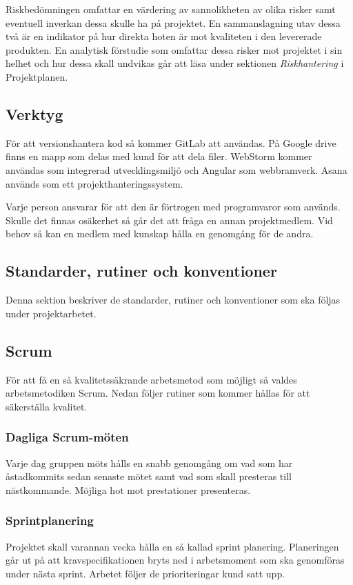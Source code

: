 \documentclass[a4paper,10pt]{article}
\begin{document}
Riskbedömningen omfattar en värdering av sannolikheten av olika risker samt eventuell inverkan dessa skulle ha på projektet. En sammanslagning utav dessa två är en indikator på hur direkta hoten är mot kvaliteten i den levererade produkten.
En analytisk förstudie som omfattar dessa risker mot projektet i sin helhet och hur dessa skall undvikas går att läsa under sektionen \emph{Riskhantering} i Projektplanen.

\subsection{Verktyg}
\label{sec:Verktyg}

För att versionshantera kod så kommer GitLab att användas. På Google drive finns en mapp som delas med kund för att dela filer. WebStorm kommer användas som integrerad utvecklingsmiljö och Angular som webbramverk. Asana används som ett projekthanteringssystem.

Varje person ansvarar för att den är förtrogen med programvaror som används. Skulle det finnas osäkerhet så går det att fråga en annan projektmedlem. Vid behov så kan en medlem med kunskap hålla en genomgång för de andra.

\subsection{Standarder, rutiner och konventioner}
Denna sektion beskriver de standarder, rutiner och konventioner som ska följas under projektarbetet.

\subsection{Scrum}
\label{sec:Scrum}
För att få en så kvalitetssäkrande arbetsmetod som möjligt så valdes arbetsmetodiken Scrum. Nedan följer rutiner som kommer hållas för att säkerställa kvalitet.

\subsubsection{Dagliga Scrum-möten}
Varje dag gruppen möts hålls en snabb genomgång om vad som har åstadkommits sedan senaste mötet samt vad som skall presteras till nästkommande. Möjliga hot mot prestationer presenteras.

\subsubsection{Sprintplanering}
Projektet skall varannan vecka hålla en så kallad sprint planering. Planeringen går ut på att kravspecifikationen bryts ned i arbetsmoment som ska genomföras under nästa sprint. Arbetet följer de prioriteringar kund satt upp.
\end{document}
